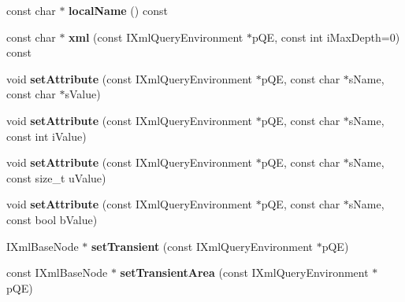 \begin{DoxyCompactItemize}
\item 
\hypertarget{classgeneral__server_1_1DatabaseNode_a0b7187c83784a10fd2d0dc79b1a24327}{const char $\ast$ {\bfseries local\-Name} () const }\label{classgeneral__server_1_1DatabaseNode_a0b7187c83784a10fd2d0dc79b1a24327}

\item 
\hypertarget{classgeneral__server_1_1DatabaseNode_ae70e09bcffe329e82bed5fcac4d55ffd}{const char $\ast$ {\bfseries xml} (const \-I\-Xml\-Query\-Environment $\ast$p\-Q\-E, const int i\-Max\-Depth=0) const }\label{classgeneral__server_1_1DatabaseNode_ae70e09bcffe329e82bed5fcac4d55ffd}

\item 
\hypertarget{classgeneral__server_1_1DatabaseNode_a34013049e574167d6e4c984aac909e19}{void {\bfseries set\-Attribute} (const \-I\-Xml\-Query\-Environment $\ast$p\-Q\-E, const char $\ast$s\-Name, const char $\ast$s\-Value)}\label{classgeneral__server_1_1DatabaseNode_a34013049e574167d6e4c984aac909e19}

\item 
\hypertarget{classgeneral__server_1_1DatabaseNode_a5f41cd3c9e226e23bc18f05ed10a7f3b}{void {\bfseries set\-Attribute} (const \-I\-Xml\-Query\-Environment $\ast$p\-Q\-E, const char $\ast$s\-Name, const int i\-Value)}\label{classgeneral__server_1_1DatabaseNode_a5f41cd3c9e226e23bc18f05ed10a7f3b}

\item 
\hypertarget{classgeneral__server_1_1DatabaseNode_ad4feb2c5b7212e861134c55a39d54091}{void {\bfseries set\-Attribute} (const \-I\-Xml\-Query\-Environment $\ast$p\-Q\-E, const char $\ast$s\-Name, const size\-\_\-t u\-Value)}\label{classgeneral__server_1_1DatabaseNode_ad4feb2c5b7212e861134c55a39d54091}

\item 
\hypertarget{classgeneral__server_1_1DatabaseNode_acff31f2e0e7983346190548d5e2f9a1a}{void {\bfseries set\-Attribute} (const \-I\-Xml\-Query\-Environment $\ast$p\-Q\-E, const char $\ast$s\-Name, const bool b\-Value)}\label{classgeneral__server_1_1DatabaseNode_acff31f2e0e7983346190548d5e2f9a1a}

\item 
\hypertarget{classgeneral__server_1_1DatabaseNode_ac2a9c88625c6840cc76e4c05df4f8a2f}{\-I\-Xml\-Base\-Node $\ast$ {\bfseries set\-Transient} (const \-I\-Xml\-Query\-Environment $\ast$p\-Q\-E)}\label{classgeneral__server_1_1DatabaseNode_ac2a9c88625c6840cc76e4c05df4f8a2f}

\item 
\hypertarget{classgeneral__server_1_1DatabaseNode_a596ae834e6dc6b9910403c5d04d1bbf3}{const \-I\-Xml\-Base\-Node $\ast$ {\bfseries set\-Transient\-Area} (const \-I\-Xml\-Query\-Environment $\ast$p\-Q\-E)}\label{classgeneral__server_1_1DatabaseNode_a596ae834e6dc6b9910403c5d04d1bbf3}


\end{DoxyCompactItemize}
